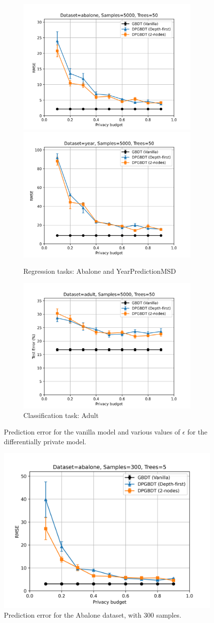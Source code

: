 \begin{figure}[h!]
  \begin{subfigure}{\linewidth}
  \includegraphics[width=.5\linewidth]{images/evaluation/abalone_5000.png}\hfill
  \includegraphics[width=.5\linewidth]{images/evaluation/year_5000.png}
  \caption{Regression tasks: Abalone and YearPredictionMSD}
  \end{subfigure}\par\medskip
  \begin{subfigure}{\linewidth}
  \center\includegraphics[width=.5\linewidth]{images/evaluation/adult_5000.png}
  \caption{Classification task: Adult}
  \end{subfigure}
  \caption{\label{fig:results_real}Prediction error for the vanilla model and various values of $\epsilon$ for the differentially private model.}
\end{figure}

\begin{figure}[h!]
	\center
	\includegraphics[width=.5\linewidth]{images/evaluation/abalone_300.png}
	\caption{\label{fig:abalone_300} Prediction error for the Abalone dataset, with 300 samples.}
\end{figure}

